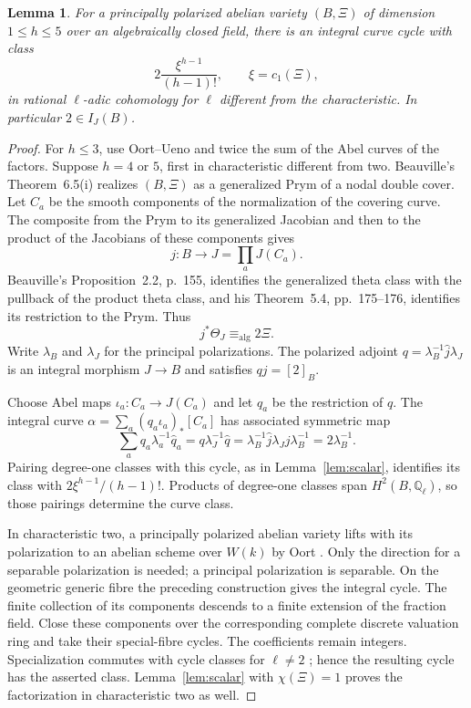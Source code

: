 \documentclass[11pt]{article}
\newcommand{\Q}{\mathbb Q}
\newcommand{\alg}{\mathrm{alg}}
\newtheorem{lemma}[theorem]{Lemma}
\theoremstyle{definition}
\theoremstyle{remark}
\begin{document}
\begin{lemma}\label{lem:prym}
For a principally polarized abelian variety $(B,\Xi)$ of dimension $1\leq h\leq5$ over an algebraically closed field, there is an integral curve cycle with class
\[
                      2\frac{\xi^{h-1}}{(h-1)!},\qquad\xi=c_1(\Xi),
\]
in rational $\ell$-adic cohomology for $\ell$ different from the characteristic. In particular $2\in I_J(B)$.
\end{lemma}
\begin{proof}
For $h\leq3$, use Oort--Ueno and twice the sum of the Abel curves of the factors. Suppose $h=4$ or $5$, first in characteristic different from two. Beauville's Theorem~6.5(i) \cite[p.~178]{Beauville} realizes $(B,\Xi)$ as a generalized Prym of a nodal double cover. Let $C_a$ be the smooth components of the normalization of the covering curve. The composite from the Prym to its generalized Jacobian and then to the product of the Jacobians of these components gives
\[
                         j:B\longrightarrow J=\prod_aJ(C_a).
\]
Beauville's Proposition~2.2, p.~155, identifies the generalized theta class with the pullback of the product theta class, and his Theorem~5.4, pp.~175--176, identifies its restriction to the Prym. Thus
\[
                         j^*\Theta_J\equiv_{\alg}2\Xi.
\]
Write $\lambda_B$ and $\lambda_J$ for the principal polarizations. The polarized adjoint $q=\lambda_B^{-1}\widehat j\lambda_J$ is an integral morphism $J\to B$ and satisfies $qj=[2]_B$.

Choose Abel maps $\iota_a:C_a\to J(C_a)$ and let $q_a$ be the restriction of $q$. The integral curve $\alpha=\sum_a(q_a\iota_a)_*[C_a]$ has associated symmetric map
\[
 \sum_aq_a\lambda_a^{-1}\widehat q_a
 =q\lambda_J^{-1}\widehat q
 =\lambda_B^{-1}\widehat j\lambda_Jj\lambda_B^{-1}
 =2\lambda_B^{-1}.
\]
Pairing degree-one classes with this cycle, as in Lemma~\ref{lem:scalar}, identifies its class with $2\xi^{h-1}/(h-1)!$. Products of degree-one classes span $H^2(B,\Q_\ell)$, so those pairings determine the curve class.

In characteristic two, a principally polarized abelian variety lifts with its polarization to an abelian scheme over $W(k)$ by Oort \cite[Theorem~2.4.1 and Corollary~2.4.2, pp.~286--287]{Oort}. Only the direction for a separable polarization is needed; a principal polarization is separable. On the geometric generic fibre the preceding construction gives the integral cycle. The finite collection of its components descends to a finite extension of the fraction field. Close these components over the corresponding complete discrete valuation ring and take their special-fibre cycles. The coefficients remain integers. Specialization commutes with cycle classes for $\ell\ne2$ \cite[\S20.3, pp.~399--400]{Fulton}; hence the resulting cycle has the asserted class. Lemma~\ref{lem:scalar} with $\chi(\Xi)=1$ proves the factorization in characteristic two as well.
\end{proof}
\end{document}
